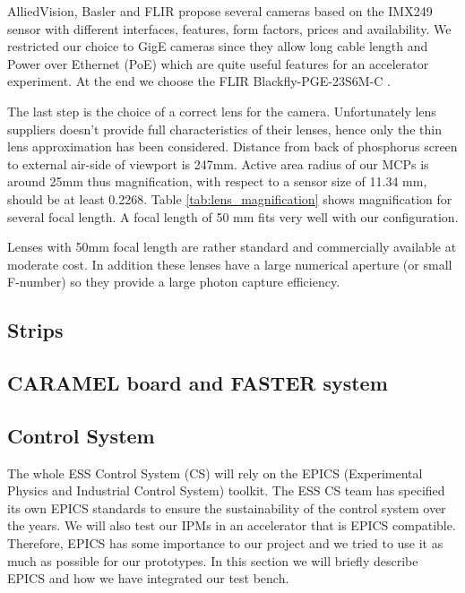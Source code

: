 \begin{refsection}
  AlliedVision, Basler and FLIR propose several cameras based on the IMX249 sensor with different interfaces, features, form factors, prices and availability.
  We restricted our choice to GigE cameras since they allow long cable length and Power over Ethernet (PoE) which are quite useful features for an accelerator experiment.
  At the end we choose the FLIR Blackfly-PGE-23S6M-C \cite{blackfly2019}.

  The last step is the choice of a correct lens for the camera.
  Unfortunately lens suppliers doesn't provide full characteristics of their lenses, hence only the thin lens approximation has been considered.
  Distance from back of phosphorus screen to external air-side of viewport is 247mm. Active area radius of our MCPs is around 25mm thus magnification, with respect to a sensor size of 11.34 mm, should be at least 0.2268.
  Table \ref{tab:lens_magnification} shows magnification for several focal length. A focal length of 50 mm fits very well with our configuration.
  

  Lenses with 50mm focal length are rather standard and commercially available at moderate cost. In addition these lenses have a large numerical aperture (or small F-number) so they provide a large photon capture efficiency.

  \subsection{Strips}
  \subsection{CARAMEL board and FASTER system}
  \cite{ddc316}\cite{caramel2013}\cite{faster2013}\cite{rhb2012}
  \subsection{Control System}
  The whole ESS Control System (CS) will rely on the EPICS (Experimental Physics and Industrial Control System) toolkit. The ESS CS team has specified its own EPICS standards to ensure the sustainability of the control system over the years. We will also test our IPMs in an accelerator that is EPICS compatible. Therefore, EPICS has some importance to our project and we tried to use it as much as possible for our prototypes. In this section we will briefly describe EPICS and how we have integrated our test bench.


\end{refsection}
